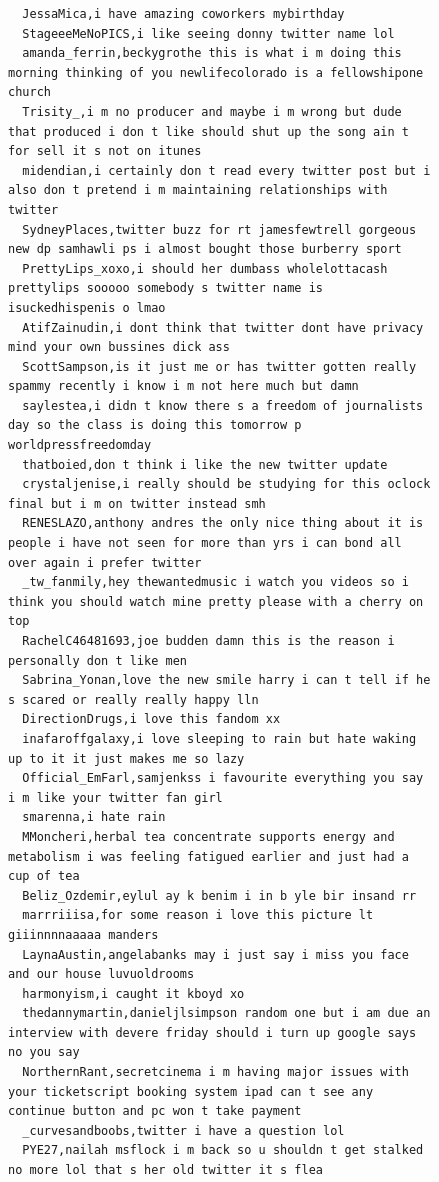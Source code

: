\begin{figure}[htpb]
\begin{verbatim}
  JessaMica,i have amazing coworkers mybirthday
  StageeeMeNoPICS,i like seeing donny twitter name lol
  amanda_ferrin,beckygrothe this is what i m doing this morning thinking of you newlifecolorado is a fellowshipone church
  Trisity_,i m no producer and maybe i m wrong but dude that produced i don t like should shut up the song ain t for sell it s not on itunes
  midendian,i certainly don t read every twitter post but i also don t pretend i m maintaining relationships with twitter
  SydneyPlaces,twitter buzz for rt jamesfewtrell gorgeous new dp samhawli ps i almost bought those burberry sport
  PrettyLips_xoxo,i should her dumbass wholelottacash prettylips sooooo somebody s twitter name is isuckedhispenis o lmao
  AtifZainudin,i dont think that twitter dont have privacy mind your own bussines dick ass
  ScottSampson,is it just me or has twitter gotten really spammy recently i know i m not here much but damn
  saylestea,i didn t know there s a freedom of journalists day so the class is doing this tomorrow p worldpressfreedomday
  thatboied,don t think i like the new twitter update
  crystaljenise,i really should be studying for this oclock final but i m on twitter instead smh
  RENESLAZO,anthony andres the only nice thing about it is people i have not seen for more than yrs i can bond all over again i prefer twitter
  _tw_fanmily,hey thewantedmusic i watch you videos so i think you should watch mine pretty please with a cherry on top
  RachelC46481693,joe budden damn this is the reason i personally don t like men
  Sabrina_Yonan,love the new smile harry i can t tell if he s scared or really really happy lln
  DirectionDrugs,i love this fandom xx
  inafaroffgalaxy,i love sleeping to rain but hate waking up to it it just makes me so lazy
  Official_EmFarl,samjenkss i favourite everything you say i m like your twitter fan girl
  smarenna,i hate rain
  MMoncheri,herbal tea concentrate supports energy and metabolism i was feeling fatigued earlier and just had a cup of tea
  Beliz_Ozdemir,eylul ay k benim i in b yle bir insand rr
  marrriiisa,for some reason i love this picture lt giiinnnnaaaaa manders
  LaynaAustin,angelabanks may i just say i miss you face and our house luvuoldrooms
  harmonyism,i caught it kboyd xo
  thedannymartin,danieljlsimpson random one but i am due an interview with devere friday should i turn up google says no you say
  NorthernRant,secretcinema i m having major issues with your ticketscript booking system ipad can t see any continue button and pc won t take payment
  _curvesandboobs,twitter i have a question lol
  PYE27,nailah msflock i m back so u shouldn t get stalked no more lol that s her old twitter it s flea

\end{verbatim}
\end{figure}
